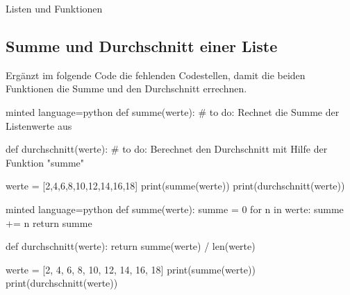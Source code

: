 \begin{task}[points=auto]{Listen und Funktionen}
    \begin{subtask*}[points=0]{}
        \subsection{Summe und Durchschnitt einer Liste }
        Ergänzt im folgende Code die fehlenden Codestellen, damit die beiden Funktionen die Summe und den Durchschnitt errechnen.
        \begin{codeBlock}[]{minted language=python}
            def summe(werte):
                # to do: Rechnet die Summe der Listenwerte aus

            def durchschnitt(werte):
                # to do: Berechnet den Durchschnitt mit Hilfe der Funktion "summe"

            werte = [2,4,6,8,10,12,14,16,18]
            print(summe(werte))
            print(durchschnitt(werte))
        \end{codeBlock}

        \begin{solution}
            \begin{codeBlock}[]{minted language=python}
                def summe(werte):
                    summe = 0
                    for n in werte:
                        summe += n
                    return summe

                def durchschnitt(werte):
                    return summe(werte) / len(werte)

                werte = [2, 4, 6, 8, 10, 12, 14, 16, 18]
                print(summe(werte))
                print(durchschnitt(werte))
            \end{codeBlock}
        \end{solution}
    \end{subtask*}
\end{task}
